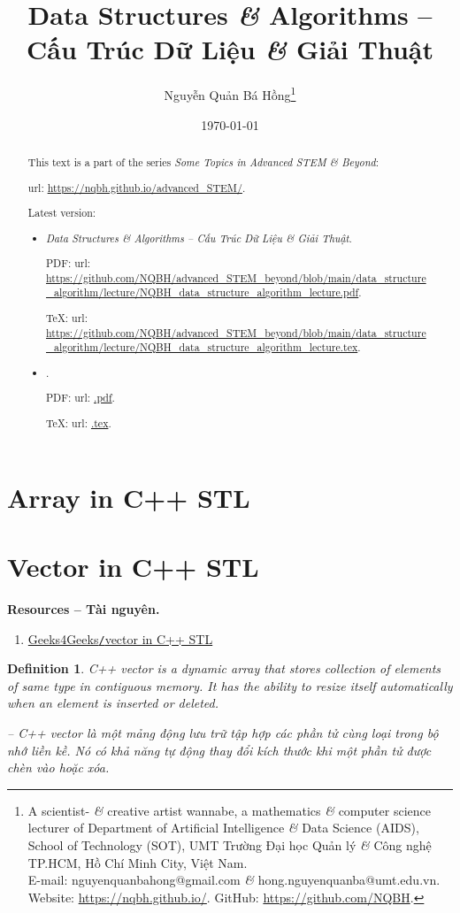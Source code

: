 \documentclass{article}
\title{Data Structures {\it\&} Algorithms -- Cấu Trúc Dữ Liệu {\it\&} Giải Thuật}
\author{Nguyễn Quản Bá Hồng\footnote{A scientist- {\it\&} creative artist wannabe, a mathematics {\it\&} computer science lecturer of Department of Artificial Intelligence {\it\&} Data Science (AIDS), School of Technology (SOT), UMT Trường Đại học Quản lý {\it\&} Công nghệ TP.HCM, Hồ Chí Minh City, Việt Nam.\\E-mail: {\sf nguyenquanbahong@gmail.com} {\it\&} {\sf hong.nguyenquanba@umt.edu.vn}. Website: \url{https://nqbh.github.io/}. GitHub: \url{https://github.com/NQBH}.}}
\date{\today}
\newtheorem{definition}{Definition}
\begin{document}
\maketitle
\begin{abstract}
	This text is a part of the series {\it Some Topics in Advanced STEM \& Beyond}:
	
	{\sc url}: \url{https://nqbh.github.io/advanced_STEM/}.
	
	Latest version:
	\begin{itemize}
		\item {\it Data Structures \& Algorithms -- Cấu Trúc Dữ Liệu \& Giải Thuật}.
		
		PDF: {\sc url}: \url{https://github.com/NQBH/advanced_STEM_beyond/blob/main/data_structure_algorithm/lecture/NQBH_data_structure_algorithm_lecture.pdf}.
		
		\TeX: {\sc url}: \url{https://github.com/NQBH/advanced_STEM_beyond/blob/main/data_structure_algorithm/lecture/NQBH_data_structure_algorithm_lecture.tex}.
		\item {\it }.
		
		PDF: {\sc url}: \url{.pdf}.
		
		\TeX: {\sc url}: \url{.tex}.
	\end{itemize}
\end{abstract}
\tableofcontents


\section{Array in C++ STL}


\section{Vector in C++ STL}
\textbf{\textsf{Resources -- Tài nguyên.}}
\begin{enumerate}
	\item \href{https://www.geeksforgeeks.org/vector-in-cpp-stl/}{Geeks4Geeks{\tt/}vector in C++ STL}
\end{enumerate}

\begin{definition}
	{\rm C++ vector} is a dynamic array that stores collection of elements of same type in contiguous memory. It has the ability to resize itself automatically when an element is inserted or deleted.
	
	-- {\rm C++ vector} là một mảng động lưu trữ tập hợp các phần tử cùng loại trong bộ nhớ liền kề. Nó có khả năng tự động thay đổi kích thước khi một phần tử được chèn vào hoặc xóa.
\end{definition}
\end{document}
